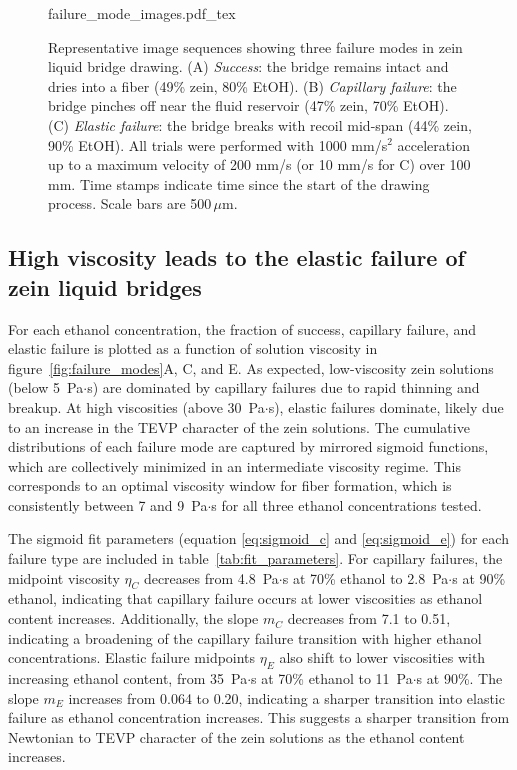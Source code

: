 \documentclass[lineno]{JFM-FLM_Au}
\begin{document}
\begin{figure}[tbp]
  \centering
  \def\svgwidth{0.9\textwidth} %
  {failure_mode_images.pdf_tex}
\caption{
	Representative image sequences showing three failure modes in zein liquid bridge drawing. 
	(A) \emph{Success}: the bridge remains intact and dries into a fiber (49\% zein, 80\% EtOH). 
	(B) \emph{Capillary failure}: the bridge pinches off near the fluid reservoir (47\% zein, 70\% EtOH). 
	(C) \emph{Elastic failure}: the bridge breaks with recoil mid-span (44\% zein, 90\% EtOH). 
	All trials were performed with 1000 mm/s$^2$ acceleration up to a maximum velocity of 200 mm/s (or 10 mm/s for C) over 100 mm. Time stamps indicate time since the start of the drawing process. Scale bars are 500\,$\mu$m.
}
\label{fig:failure_mode_sequences}
\end{figure}


\subsection{High viscosity leads to the elastic failure of zein liquid bridges}
For each ethanol concentration, the fraction of success, capillary failure, and elastic failure is plotted as a function of solution viscosity in figure~\ref{fig:failure_modes}A, C, and E. As expected, low-viscosity zein solutions (below 5~Pa$\cdot$s) are dominated by capillary failures due to rapid thinning and breakup. At high viscosities (above 30~Pa$\cdot$s), elastic failures dominate, likely due to an increase in the TEVP character of the zein solutions. The cumulative distributions of each failure mode are captured by mirrored sigmoid functions, which are collectively minimized in an intermediate viscosity regime. This corresponds to an optimal viscosity window for fiber formation, which is consistently between 7 and 9~Pa$\cdot$s for all three ethanol concentrations tested.

The sigmoid fit parameters (equation \ref{eq:sigmoid_c} and \ref{eq:sigmoid_e}) for each failure type are included in table~\ref{tab:fit_parameters}. For capillary failures, the midpoint viscosity $\eta_C$ decreases from 4.8~Pa$\cdot$s at 70\% ethanol to 2.8~Pa$\cdot$s at 90\% ethanol, indicating that capillary failure occurs at lower viscosities as ethanol content increases. Additionally, the slope $m_C$ decreases from 7.1 to 0.51, indicating a broadening of the capillary failure transition with higher ethanol concentrations.
Elastic failure midpoints $\eta_E$ also shift to lower viscosities with increasing ethanol content, from 35~Pa$\cdot$s at 70\% ethanol to 11~Pa$\cdot$s at 90\%. The slope $m_E$ increases from 0.064 to 0.20, indicating a sharper transition into elastic failure as ethanol concentration increases. This suggests a sharper transition from Newtonian to TEVP character of the zein solutions as the ethanol content increases.
\end{document}
